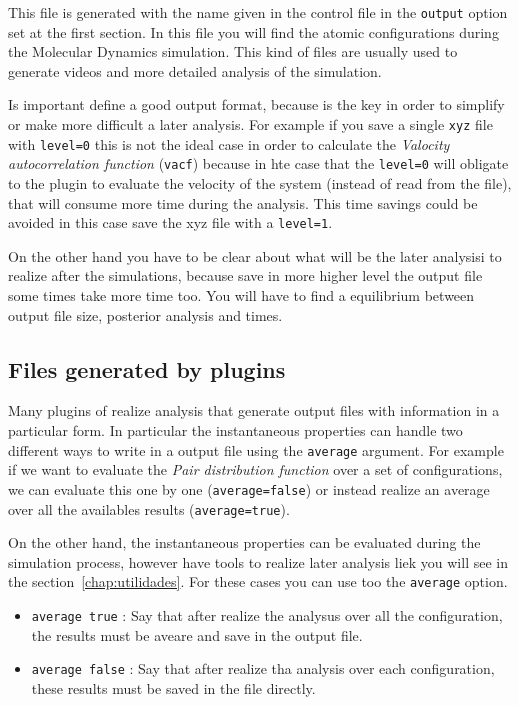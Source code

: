 This file is generated with the name given in the control file in the
\verb|output| option set at the first section. In this file you will find the
atomic configurations during the Molecular Dynamics simulation. This kind of
files are usually used to generate videos and more detailed analysis of the
simulation.

Is important define a good output format, because is the key in order to
simplify or make more difficult a later analysis. For example if you save a
single \verb|xyz| file with \verb|level=0| this is not the ideal case in order
to calculate the \textit{Valocity autocorrelation function} (\verb|vacf|)
because in hte case that the \verb|level=0| will obligate to the plugin to
evaluate the velocity of the system (instead of read from the file), that will
consume more time during the analysis. This time savings could be avoided in
this case save the xyz file with a \verb|level=1|. 

On the other hand you have to be clear about what will be the later analysisi
to realize after the simulations, because save in more higher level the output
file some times take more time too. You will have to find a equilibrium between
output file size, posterior analysis and times.

\subsection{Files generated by plugins}

Many plugins of {\lpmd} realize analysis that generate output files with
information in a particular form. In particular the instantaneous properties
can handle two different ways to write in a output file using the
\verb|average| argument. For example if we want to evaluate the \textit{Pair
distribution function} over a set of configurations, we can evaluate this one
by one (\verb|average=false|) or instead realize an average over all the
availables results (\verb|average=true|).

On the other hand, the instantaneous properties can be evaluated during the
simulation process, however {\lpmd} have tools to realize later analysis liek
you will see in the section~\ref{chap:utilidades}. For these cases you can use
too the \verb|average| option.

\begin{itemize}
\item \verb|average true| :
Say that after realize the analysus over all the configuration, the results
must be aveare and save in the output file.

\item \verb|average false| :
Say that after realize tha analysis over each configuration, these results must
be saved in the file directly.
\end{itemize}
